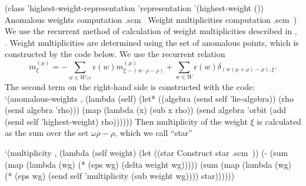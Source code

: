\documentclass[a4paper,10pt]{article}%
\theoremstyle{definition} \newtheorem{Def}{Definition}
\begin{document}
\nwenddocs{}\plusendmoddef\nwstartdeflinemarkup{}\nwenddeflinemarkup
(class 'highest-weight-representation 'representation
       '(highest-weight ())
       \LA{}Anomalous weights computation .scm~{\nwtagstyle{}}\RA{}
       \LA{}Weight multiplicities computation .scm~{\nwtagstyle{}}\RA{})
\nwendcode{}\nwdocspar
We use the recurrent method of calculation of weight multiplicities described in \cite{lyakhovsky1996rra}, \cite{kulish4sfa}. Weight multiplicities are determined using the set of anomalous points, which is constructed by the code below.
We use the recurrent relation
\begin{equation}
  m_{\xi }^{\left( \mu \right) }=-\sum_{w\in W\setminus e}\epsilon (w)m_{\xi
-\left( w\cdot\rho-\rho \right) }^{\left( \mu \right) }+\sum_{w\in W}\epsilon
(w)\delta _{\left( w(\mu +\rho )-\rho \right) ,\xi }.  \label{gen-mult-form}
\end{equation}
The second term on the right-hand side is constructed with the code:
\nwenddocs{}\endmoddef\nwstartdeflinemarkup{}\nwenddeflinemarkup
       `(anomalous-weights , 
         (lambda (self)
           (let* ((algebra (send self 'lie-algebra))
                  (rho (send algebra 'rho)))
             (map (lambda (x)
                    (sub x rho))
                  (send algebra 'orbit (add (send self 'highest-weight) rho))))))
\nwendcode{}\nwdocspar
Then multiplicity of the weight $\xi$ is calculated as the sum over the set $\omega\rho-\rho$, which we call ``star''

\nwenddocs{}\endmoddef\nwstartdeflinemarkup{}\nwenddeflinemarkup
`(multiplicity , (lambda (self weight)
                   (let ((star \LA{}Construct star .scm~{\nwtagstyle{}}\RA{}))
                     (-
                      (sum (map (lambda (wg) (* (eps wg) (delta weight wg)))))
                      (sum (map (lambda (wg)
                                    (* (eps wg)
                                       (send self 'multiplicity (sub weight wg))))
                                  star))))))
  
\end{document}
